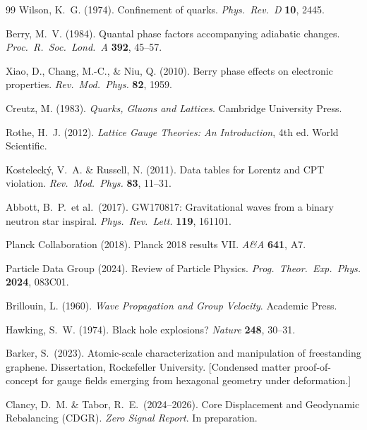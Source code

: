 \documentclass[11pt,letterpaper]{article}
\begin{document}

\begin{thebibliography}{99}
  Wilson, K.~G. (1974).
  Confinement of quarks.
  \textit{Phys.\ Rev.\ D} \textbf{10}, 2445.

  Berry, M.~V. (1984).
  Quantal phase factors accompanying adiabatic changes.
  \textit{Proc.\ R.\ Soc.\ Lond.\ A} \textbf{392}, 45--57.

  Xiao, D., Chang, M.-C., \& Niu, Q. (2010).
  Berry phase effects on electronic properties.
  \textit{Rev.\ Mod.\ Phys.} \textbf{82}, 1959.

  Creutz, M. (1983).
  \textit{Quarks, Gluons and Lattices}.
  Cambridge University Press.

  Rothe, H.~J. (2012).
  \textit{Lattice Gauge Theories: An Introduction}, 4th ed.
  World Scientific.

  Kosteleck\'y, V.~A. \& Russell, N. (2011).
  Data tables for Lorentz and CPT violation.
  \textit{Rev.\ Mod.\ Phys.} \textbf{83}, 11--31.

  Abbott, B.~P.\ et al.\ (2017).
  GW170817: Gravitational waves from a binary neutron star inspiral.
  \textit{Phys.\ Rev.\ Lett.} \textbf{119}, 161101.

  Planck Collaboration (2018).
  Planck 2018 results VII\@.
  \textit{A\&A} \textbf{641}, A7.

  Particle Data Group (2024).
  Review of Particle Physics.
  \textit{Prog.\ Theor.\ Exp.\ Phys.} \textbf{2024}, 083C01.

  Brillouin, L. (1960).
  \textit{Wave Propagation and Group Velocity}.
  Academic Press.

  Hawking, S.~W. (1974).
  Black hole explosions?
  \textit{Nature} \textbf{248}, 30--31.

  Barker, S.\ (2023).
  Atomic-scale characterization and manipulation of freestanding graphene.
  Dissertation, Rockefeller University.
  [Condensed matter proof-of-concept for gauge fields emerging from
  hexagonal geometry under deformation.]

  Clancy, D.~M. \& Tabor, R.~E.\ (2024--2026).
  Core Displacement and Geodynamic Rebalancing (CDGR).
  \textit{Zero Signal Report}.  In preparation.
\end{thebibliography}
\end{document}
